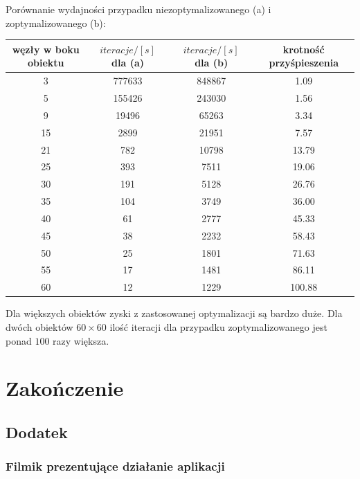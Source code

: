 \documentclass[12pt, letterpaper]{report}
\begin{document}
    Porównanie wydajności przypadku niezoptymalizowanego (a) i zoptymalizowanego (b):
    \begin{center}
        \begin{tabular}{||c c c c||} 
         \hline
         węzły w boku obiektu & $iteracje / [s]$ dla (a) & $iteracje / [s]$ dla (b) & krotność przyśpieszenia \\ [0.5ex] 
         \hline\hline
         3 & 777633 & 848867 & 1.09 \\ 
         \hline
         5 & 155426 & 243030 & 1.56 \\
         \hline
         9 & 19496 & 65263 & 3.34 \\
         \hline
         15 & 2899 & 21951 & 7.57 \\
         \hline
         21 & 782 & 10798 & 13.79 \\
         \hline
         25 & 393 & 7511 & 19.06 \\
         \hline
         30 & 191 & 5128 & 26.76 \\
         \hline
         35 & 104 & 3749 & 36.00 \\
         \hline
         40 & 61 & 2777 & 45.33 \\ 
         \hline
         45 & 38 & 2232 & 58.43 \\ 
         \hline
         50 & 25 & 1801 & 71.63 \\
         \hline
         55 & 17 & 1481 & 86.11 \\ 
         \hline
         60 & 12 & 1229 & 100.88 \\ [1ex] 
         \hline
        \end{tabular}
    \end{center}
    
    Dla większych obiektów zyski z zastosowanej optymalizacji są bardzo duże. Dla dwóch obiektów
    $60 \times 60$ ilość iteracji dla przypadku zoptymalizowanego jest ponad $100$ razy większa.

\chapter{Zakończenie}
    \section{Dodatek}

    \subsection{Filmik prezentujące działanie aplikacji}
\end{document}

